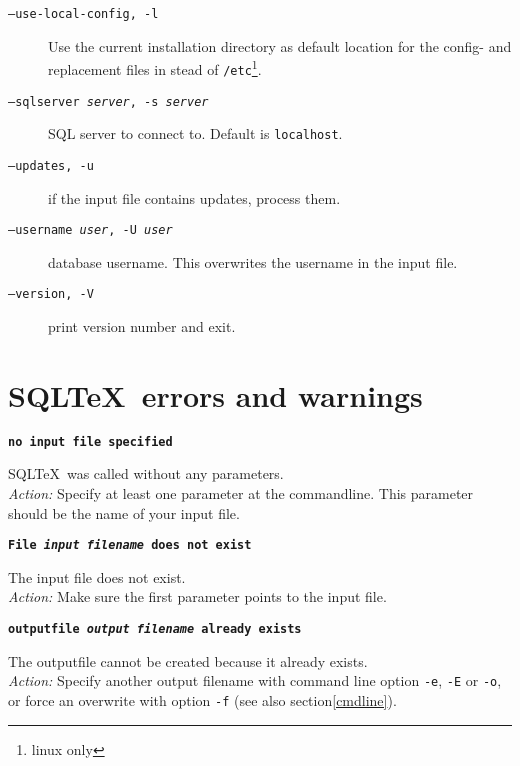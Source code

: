 \documentclass{article}
\newcommand{\vs}{\vspace{3mm}}
\begin{document}
\begin{description}
\item[\texttt{--use-local-config, -l}] Use the current installation directory as default location for the config- and replacement files in stead of \texttt{/etc}\footnote{ linux only}.

\item[\texttt{--sqlserver \textit{server}, -s \textit{server}}] SQL server to connect to. Default is \texttt{localhost}.

\item[\texttt{--updates, -u}] if the input file contains updates, process them.

\item[\texttt{--username \textit{user}, -U \textit{user}}] database username. This overwrites the username in the input file.

\item[\texttt{--version, -V}] print version number and exit.
\end{description}



\section{SQL\TeX\ errors and warnings}

\noindent\textbf{\texttt{no input file specified}}

\vspace{1mm}

\noindent SQL\TeX\ was called without any parameters.\\
\textit{Action:} Specify at least one parameter at the commandline. This parameter should be
the name of your input file.

\vs

\noindent\textbf{\texttt{File \textit{input filename} does not exist}}

\vspace{1mm}

\noindent The input file does not exist.\\
\textit{Action:} Make sure the first parameter points to the input file.

\vs

\noindent\textbf{\texttt{outputfile \textit{output filename} already exists}}

\vspace{1mm}

\noindent The outputfile cannot be created because it already exists.\\
\textit{Action:} Specify another output filename with command line option \texttt{-e},
\texttt{-E} or \texttt{-o}, or force an overwrite with option \texttt{-f} (see also section\ref{cmdline}).
\end{document}
